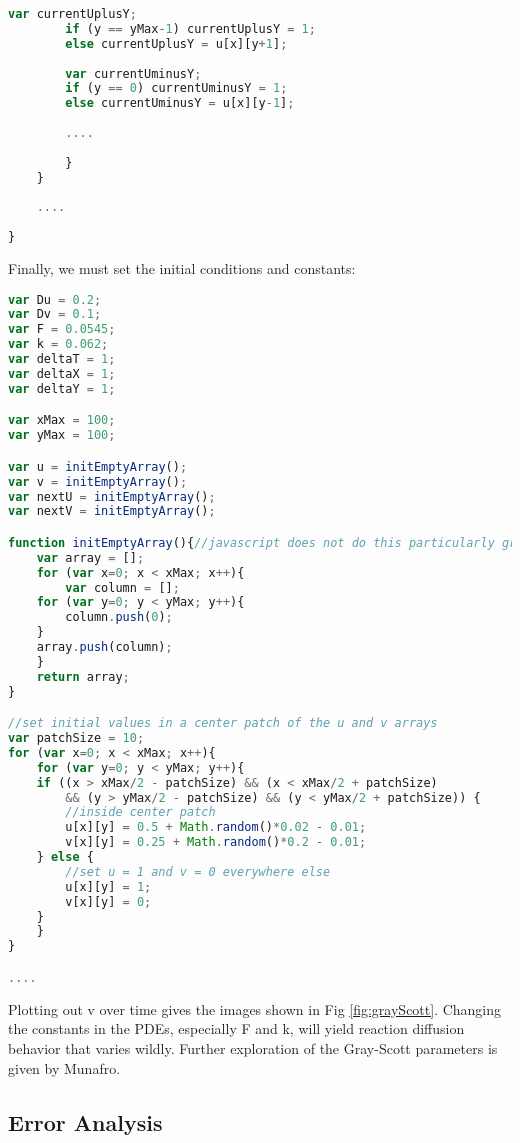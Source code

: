 {\begin{lstlisting}[language=JavaScript]
	    var currentUplusY;
	    if (y == yMax-1) currentUplusY = 1;
	    else currentUplusY = u[x][y+1];
	    
	    var currentUminusY;
	    if (y == 0) currentUminusY = 1;
	    else currentUminusY = u[x][y-1];
		
	    ....
	
    	}
    }
    
    ....
    
}
\end{lstlisting}

Finally, we must set the initial conditions and constants:\\
\begin{lstlisting}[language=JavaScript]
var Du = 0.2;
var Dv = 0.1;
var F = 0.0545;
var k = 0.062;
var deltaT = 1;
var deltaX = 1;
var deltaY = 1;

var xMax = 100;
var yMax = 100;

var u = initEmptyArray();
var v = initEmptyArray();
var nextU = initEmptyArray();
var nextV = initEmptyArray();

function initEmptyArray(){//javascript does not do this particularly gracefully
    var array = [];
    for (var x=0; x < xMax; x++){
    	var column = [];
	for (var y=0; y < yMax; y++){
	    column.push(0);
	}
	array.push(column);
    }
    return array;
}

//set initial values in a center patch of the u and v arrays
var patchSize = 10;
for (var x=0; x < xMax; x++){
    for (var y=0; y < yMax; y++){
	if ((x > xMax/2 - patchSize) && (x < xMax/2 + patchSize) 
	    && (y > yMax/2 - patchSize) && (y < yMax/2 + patchSize)) {
	    //inside center patch
	    u[x][y] = 0.5 + Math.random()*0.02 - 0.01;
	    v[x][y] = 0.25 + Math.random()*0.2 - 0.01;
	} else {
	    //set u = 1 and v = 0 everywhere else
	    u[x][y] = 1;
	    v[x][y] = 0;
	}
    }
}

....

\end{lstlisting}

Plotting out v over time gives the images shown in Fig \ref{fig:grayScott}.  Changing the constants in the PDEs, especially F and k, will yield reaction diffusion behavior that varies wildly.  Further exploration of the Gray-Scott parameters is given by Munafro\cite{Munafo2016}.

\subsection{Error Analysis}\label{sec:errorAnalysis}

}
